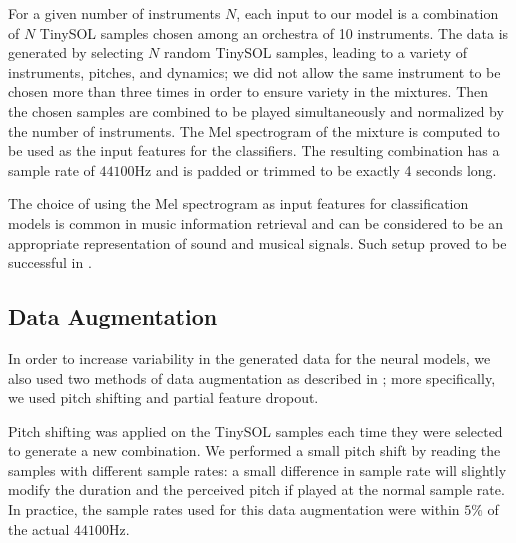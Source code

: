\documentclass[runningheads,a4paper]{llncs}
\begin{document}

For a given number of instruments $N$, each input to our model is a combination of $N$ TinySOL samples chosen among an orchestra of 10 instruments. The data is generated by selecting $N$ random TinySOL samples, leading to a variety of instruments, pitches, and dynamics; we did not allow the same instrument to be chosen more than three times in order to ensure variety in the mixtures. Then the chosen samples are combined to be played simultaneously and normalized by the number of instruments. The Mel spectrogram of the mixture is computed to be used as the input features for the classifiers. The resulting combination has a sample rate of $44100$Hz and is padded or trimmed to be exactly 4 seconds long.

The choice of using the Mel spectrogram as input features for classification models is common in music information retrieval \cite{McKinney2003} and can be considered to be an appropriate representation of sound and musical signals. %
Such setup proved to be successful in \cite{Salamon17}.


\subsection{Data Augmentation}

In order to increase variability in the generated data for the neural models, we also used two methods of data augmentation as described in \cite{Salamon17, Bhardwaj17}; more specifically, we used pitch shifting and partial feature dropout.

Pitch shifting was applied on the TinySOL samples each time they were selected to generate a new combination. We performed a small pitch shift by reading the samples with different sample rates: a small difference in sample rate will slightly modify the duration and the perceived pitch if played at the normal sample rate. In practice, the sample rates used for this data augmentation were within $5\%$ of the actual $44100$Hz.
\end{document}
